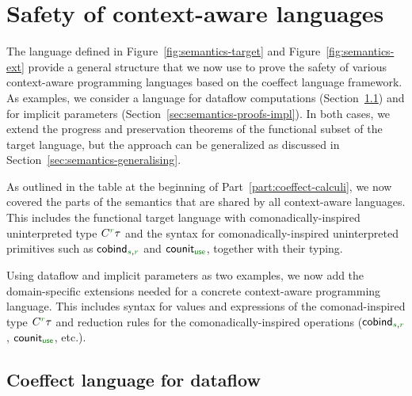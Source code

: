 %
%

\section{Safety of context-aware languages}
\label{sec:semantics-proofs}

The language defined in Figure~\ref{fig:semantics-target} and Figure~\ref{fig:semantics-ext}
provide a general structure that we now use to prove the safety of various context-aware
programming languages based on the coeffect language framework. As examples, we consider a language
for dataflow computations (Section~\ref{sec:semantics-proofs-df}) and for implicit parameters
(Section~\ref{sec:semantics-proofs-impl}). In both cases, we extend the progress and preservation
theorems of the functional subset of the target language, but the approach can be generalized as
discussed in Section~\ref{sec:semantics-generalising}.

As outlined in the table at the beginning of Part~\ref{part:coeffect-calculi}, we now covered the
parts of the semantics that are shared by all context-aware languages. This includes the functional
target language with comonadically-inspired uninterpreted type $\ctyp{\cclrd{r}}{\tau}$ and the
syntax for comonadically-inspired uninterpreted primitives such as
$\ident{cobind}_{\cclrd{s},\cclrd{r}}$ and $\ident{counit}_{\cunit}$, together with their typing.

Using dataflow and implicit parameters as two examples, we now add the domain-specific extensions
needed for a concrete context-aware programming language. This includes syntax for values and
expressions of the comonad-inspired type $\ctyp{\cclrd{r}}{\tau}$ and reduction rules for the
comonadically-inspired operations ($\ident{cobind}_{\cclrd{s},\cclrd{r}}$, $\ident{counit}_{\cunit}$, etc.).


\subsection{Coeffect language for dataflow}
\label{sec:semantics-proofs-df}

